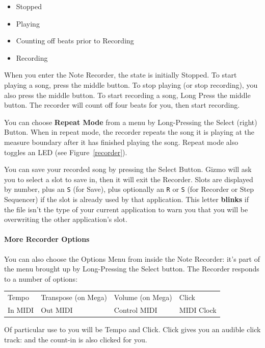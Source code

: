 \documentclass{article}
\begin{document}
\begin{itemize}
\item Stopped
\item Playing
\item Counting off beats prior to Recording
\item Recording
\end{itemize}

When you enter the Note Recorder, the state is initially Stopped.  To start playing a song, press the middle button.  To stop playing (or stop recording), you also press the middle button.  To start recording a song, Long Press the middle button.  The recorder will count off four beats for you, then start recording.

You can choose {\bf Repeat Mode} from a menu by Long-Pressing the Select (right) Button.  When in repeat mode, the recorder repeats the song it is playing at the measure boundary after it has finished playing the song.  Repeat mode also toggles an LED (see Figure~\ref{recorder}).

You can save your recorded song by pressing the Select Button.  Gizmo will ask you to select a slot to save in, then it will exit the Recorder.  Slots are displayed by number, plus an \texttt{S} (for Save), plus optionally an \texttt{R} or \texttt{S} (for Recorder or Step Sequencer) if the slot is already used by that application.  This letter {\bf blinks} if the file isn't the type of your current application to warn you that you will be overwriting the other application's slot.

\paragraph{More Recorder Options}  
You can also choose the Options Menu from inside the Note Recorder: it's part of the menu brought up by Long-Pressing the Select button.  The Recorder responds to a number of options:

\vspace{1em}
\begin{tabular}{llll}
Tempo&Transpose (on Mega)&Volume (on Mega)&Click\\
In MIDI& Out MIDI&Control MIDI&MIDI Clock\\
\end{tabular}

\vspace{1em}
Of particular use to you will be Tempo and Click.  Click gives you an audible click track: and the count-in is also clicked for you.
\end{document}
